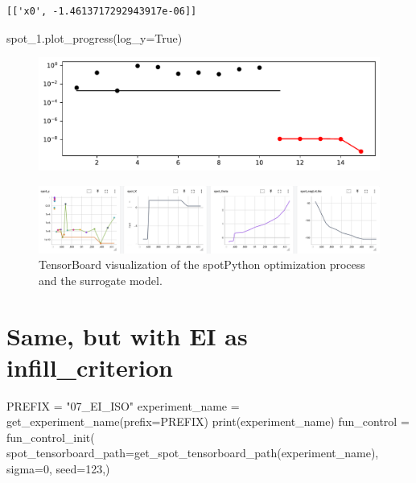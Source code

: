 \documentclass[
  letterpaper,
  DIV=11,
  numbers=noendperiod]{scrreprt}
\newenvironment{Shaded}{\begin{snugshade}}{\end{snugshade}}
\newcommand{\BuiltInTok}[1]{\textcolor[rgb]{0.00,0.23,0.31}{#1}}
\newcommand{\DecValTok}[1]{\textcolor[rgb]{0.68,0.00,0.00}{#1}}
\newcommand{\NormalTok}[1]{\textcolor[rgb]{0.00,0.23,0.31}{#1}}
\newcommand{\OperatorTok}[1]{\textcolor[rgb]{0.37,0.37,0.37}{#1}}
\newcommand{\StringTok}[1]{\textcolor[rgb]{0.13,0.47,0.30}{#1}}
\newcommand{\VariableTok}[1]{\textcolor[rgb]{0.07,0.07,0.07}{#1}}
\begin{document}
\begin{verbatim}
[['x0', -1.4613717292943917e-06]]
\end{verbatim}

\begin{Shaded}
\begin{Highlighting}[]
\NormalTok{spot\_1.plot\_progress(log\_y}\OperatorTok{=}\VariableTok{True}\NormalTok{)}
\end{Highlighting}
\end{Shaded}

\begin{figure}[H]

{\centering \includegraphics{012_num_spot_ei_files/figure-pdf/cell-8-output-1.pdf}

}

\end{figure}

\begin{figure}

{\centering \includegraphics[width=1\textwidth,height=\textheight]{figures_static/07_tensorboard_Y.png}

}

\caption{TensorBoard visualization of the spotPython optimization
process and the surrogate model.}

\end{figure}

\hypertarget{same-but-with-ei-as-infill_criterion}{%
\section{Same, but with EI as
infill\_criterion}\label{same-but-with-ei-as-infill_criterion}}

\begin{Shaded}
\begin{Highlighting}[]
\NormalTok{PREFIX }\OperatorTok{=} \StringTok{"07\_EI\_ISO"}
\NormalTok{experiment\_name }\OperatorTok{=}\NormalTok{ get\_experiment\_name(prefix}\OperatorTok{=}\NormalTok{PREFIX)}
\BuiltInTok{print}\NormalTok{(experiment\_name)}
\NormalTok{fun\_control }\OperatorTok{=}\NormalTok{ fun\_control\_init(}
\NormalTok{    spot\_tensorboard\_path}\OperatorTok{=}\NormalTok{get\_spot\_tensorboard\_path(experiment\_name),}
\NormalTok{    sigma}\OperatorTok{=}\DecValTok{0}\NormalTok{,}
\NormalTok{    seed}\OperatorTok{=}\DecValTok{123}\NormalTok{,)}
\end{Highlighting}
\end{Shaded}
\end{document}
